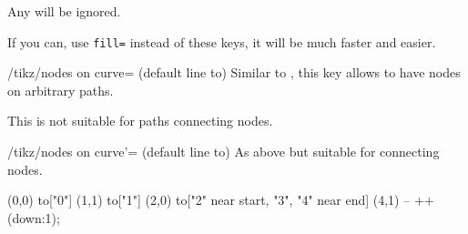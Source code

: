 \begin{multicols}{2}
Any  will be ignored.

If you can, use \texttt{fill=}
instead of these keys, it will be much faster and easier.

\begin{stylekey}{/tikz/nodes on curve= (default line to)}
Similar to , this key allows
to have nodes on arbitrary paths.

This is not suitable for paths connecting nodes.
\end{stylekey}

\begin{stylekey}{/tikz/nodes on curve'= (default line to)}
As above but suitable for connecting nodes.
\end{stylekey}

\begin{codeexample}[preamble=\usetikzlibrary{ext.nodes, intersections, quotes, spath3}]
\end{codeexample}
\begin{codeexample}[preamble=\usetikzlibrary{ext.nodes, intersections, quotes, spath3}]
\tikz[inner sep=.15em, circle, nodes={draw, green}, sloped, ultra thick]
  \draw[->, nodes on curve=bend left] (0,0) to["0"] (1,1)
                                            to["1"] (2,0)
              to["2" near start, "3", "4" near end] (4,1)
                                            -- ++(down:1);
\end{codeexample}
\end{multicols}